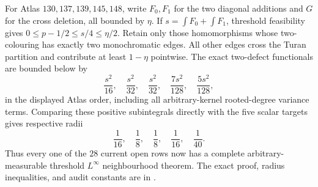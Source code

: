 \documentclass[11pt]{article}
\begin{document}
For Atlas $130,137,139,145,148$, write $F_0,F_1$ for the two diagonal
additions and $G$ for the cross deletion, all bounded by $\eta$.  If
$s=\int F_0+\int F_1$, threshold feasibility gives
$0\leq p-1/2\leq s/4\leq\eta/2$.  Retain only those homomorphisms whose
two-colouring has exactly two monochromatic edges.  All other edges cross
the Turan partition and contribute at least $1-\eta$ pointwise.  The exact
two-defect functionals are bounded below by
\[
 \frac{s^2}{16},\quad\frac{s^2}{32},\quad\frac{s^2}{32},
 \quad\frac{7s^2}{128},\quad\frac{5s^2}{128},
\]
in the displayed Atlas order, including all arbitrary-kernel rooted-degree
variance terms.  Comparing these positive subintegrals directly with the
five scalar targets gives respective radii
\[
 \frac1{16},\quad\frac18,\quad\frac18,\quad\frac1{16},\quad\frac1{40}.
\]
Thus every one of the $28$ current open rows now has a complete
arbitrary-measurable threshold $L^\infty$ neighbourhood theorem.  The exact
proof, radius inequalities, and audit constants are in
.
\end{document}
